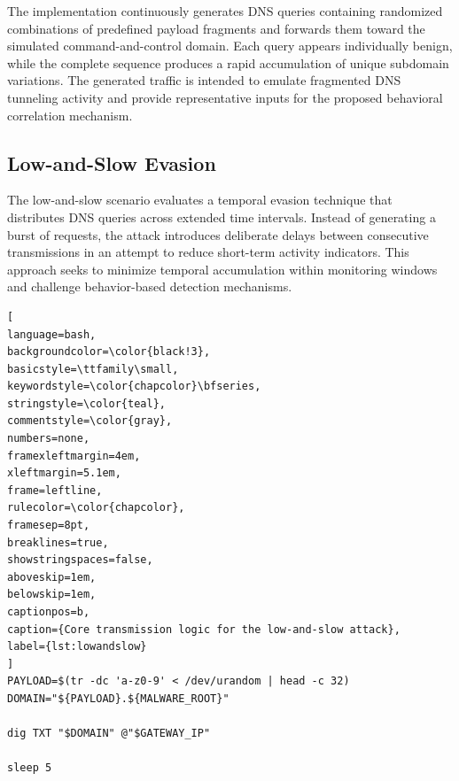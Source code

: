 \documentclass[14pt, a4paper, oneside]{report}
\begin{document}
The implementation continuously generates DNS queries containing randomized combinations of predefined payload fragments and forwards them toward the simulated command-and-control domain. Each query appears individually benign, while the complete sequence produces a rapid accumulation of unique subdomain variations. The generated traffic is intended to emulate fragmented DNS tunneling activity and provide representative inputs for the proposed behavioral correlation mechanism.

\subsection{Low-and-Slow Evasion}

The low-and-slow scenario evaluates a temporal evasion technique that distributes DNS queries across extended time intervals. Instead of generating a burst of requests, the attack introduces deliberate delays between consecutive transmissions in an attempt to reduce short-term activity indicators. This approach seeks to minimize temporal accumulation within monitoring windows and challenge behavior-based detection mechanisms.

\begin{lstlisting}[
language=bash,
backgroundcolor=\color{black!3},
basicstyle=\ttfamily\small,
keywordstyle=\color{chapcolor}\bfseries,
stringstyle=\color{teal},
commentstyle=\color{gray},
numbers=none,
framexleftmargin=4em,
xleftmargin=5.1em,
frame=leftline,
rulecolor=\color{chapcolor},
framesep=8pt,
breaklines=true,
showstringspaces=false,
aboveskip=1em,
belowskip=1em,
captionpos=b,                          
caption={Core transmission logic for the low-and-slow attack},
label={lst:lowandslow}                  
]
PAYLOAD=$(tr -dc 'a-z0-9' < /dev/urandom | head -c 32)
DOMAIN="${PAYLOAD}.${MALWARE_ROOT}"

dig TXT "$DOMAIN" @"$GATEWAY_IP"

sleep 5
\end{lstlisting}
\end{document}
